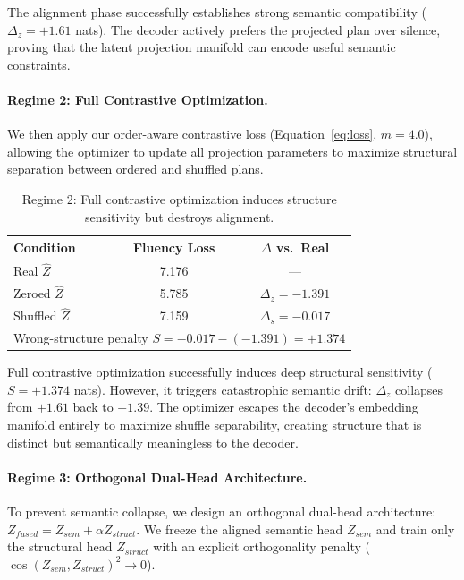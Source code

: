\documentclass[11pt]{article}
\begin{document}
The alignment phase successfully establishes strong semantic compatibility ($\Delta_z = +1.61$ nats). The decoder actively prefers the projected plan over silence, proving that the latent projection manifold can encode useful semantic constraints.

\paragraph{Regime 2: Full Contrastive Optimization.}
We then apply our order-aware contrastive loss (Equation~\ref{eq:loss}, $m=4.0$), allowing the optimizer to update all projection parameters to maximize structural separation between ordered and shuffled plans.

\begin{table}[h]
\centering
\caption{Regime 2: Full contrastive optimization induces structure sensitivity but destroys alignment.}
\label{tab:exp5_contrastive}
\begin{tabular}{lcc}
\toprule
\textbf{Condition} & \textbf{Fluency Loss} & \textbf{$\Delta$ vs.\ Real} \\
\midrule
Real $\hat{Z}$ & 7.176 & — \\
Zeroed $\hat{Z}$ & 5.785 & $\Delta_z = -1.391$ \\
Shuffled $\hat{Z}$ & 7.159 & $\Delta_s = -0.017$ \\
\midrule
\multicolumn{3}{l}{Wrong-structure penalty $S = -0.017 - (-1.391) = \mathbf{+1.374}$} \\
\bottomrule
\end{tabular}
\end{table}

Full contrastive optimization successfully induces deep structural sensitivity ($S = +1.374$ nats). However, it triggers catastrophic semantic drift: $\Delta_z$ collapses from $+1.61$ back to $-1.39$. The optimizer escapes the decoder's embedding manifold entirely to maximize shuffle separability, creating structure that is distinct but semantically meaningless to the decoder.

\paragraph{Regime 3: Orthogonal Dual-Head Architecture.}
To prevent semantic collapse, we design an orthogonal dual-head architecture: $Z_{fused} = Z_{sem} + \alpha Z_{struct}$. We freeze the aligned semantic head $Z_{sem}$ and train only the structural head $Z_{struct}$ with an explicit orthogonality penalty ($\cos(Z_{sem}, Z_{struct})^2 \to 0$).
\end{document}
